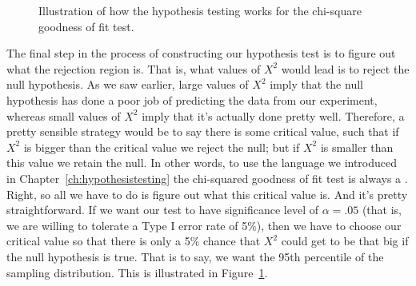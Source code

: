 

\begin{figure}
\begin{center}
\caption{Illustration of how the hypothesis testing works for the chi-square goodness of fit test.}
\label{fig:goftest}
\HR
\end{center}
\end{figure}

The final step in the process of constructing our hypothesis test is to figure out what the rejection region is. That is, what values of $X^2$ would lead is to reject the null hypothesis. As we saw earlier, large values of $X^2$ imply that the null hypothesis has done a poor job of predicting the data from our experiment, whereas small values of $X^2$ imply that it's actually done pretty well. Therefore, a pretty sensible strategy would be to say there is some critical value, such that if $X^2$ is bigger than the critical value we reject the null; but if $X^2$ is smaller than this value we retain the null. In other words, to use the language we introduced in Chapter~\ref{ch:hypothesistesting} the chi-squared goodness of fit test is always a . Right, so all we have to do is figure out what this critical value is. And it's pretty straightforward. If we want our test to have significance level of $\alpha = .05$ (that is, we are willing to tolerate a Type I error rate of 5\%), then we have to choose our critical value so that there is only a 5\% chance that $X^2$ could get to be that big if the null hypothesis is true. That is to say, we want the 95th percentile of the sampling distribution. This is illustrated in Figure~\ref{fig:goftest}.

